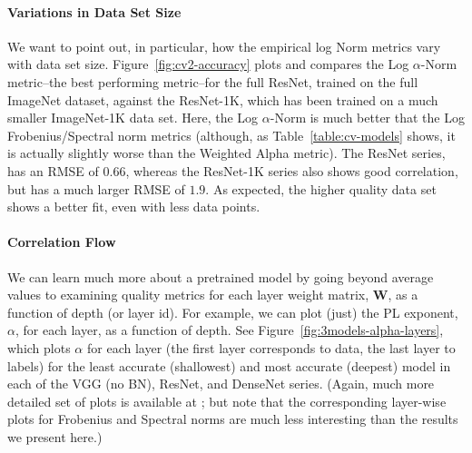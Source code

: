 \paragraph{Variations in Data Set Size}
We want to point out, in particular, how the empirical log Norm metrics vary with data set size.
Figure~\ref{fig:cv2-accuracy} plots and compares the 
Log $\alpha$-Norm
metric--the best performing metric--for the full ResNet, trained on the full ImageNet dataset, against the ResNet-1K, which has been trained on a much smaller ImageNet-1K data set.
Here, the Log $\alpha$-Norm is much better that the Log Frobenius/Spectral norm metrics (although, as Table~\ref{table:cv-models} shows, it is actually slightly worse than the Weighted Alpha metric).
The ResNet series, has an RMSE of $0.66$, whereas the ResNet-1K series also shows good correlation, but has a much larger RMSE of $1.9$.
As expected, the higher quality data set shows a better fit, even with less data points.

\paragraph{Correlation Flow}
We can learn much more about a pretrained model by going beyond average values to examining quality metrics for each layer weight matrix, $\mathbf{W}$, as a function of depth (or layer id).  %
For example, we can 
plot (just) the PL exponent, $\alpha$, for each layer,%
as a function of depth.
%
See Figure~\ref{fig:3models-alpha-layers}, which plots $\alpha$ for each layer (the first layer corresponds to data, the last layer to labels) for the least accurate (shallowest) and most accurate (deepest) model in each of the VGG (no BN), ResNet, and DenseNet series.
(Again, much more detailed set of plots is available at \cite{XXX-WEB-LINK}; but note that the corresponding layer-wise plots for Frobenius and Spectral norms are much less interesting than the results we present here.)


